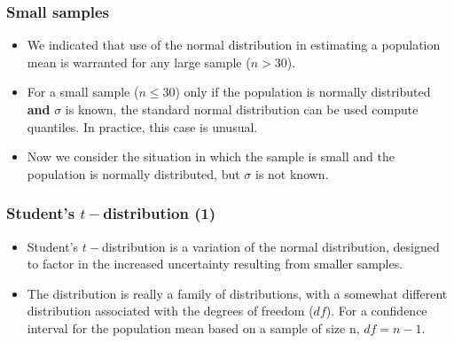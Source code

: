 \documentclass[a4]{beamer}
\begin{document}

\begin{frame}
\frametitle{Small samples}
\begin{itemize} \item We indicated that use of the normal distribution in estimating a population mean is warranted
for any large sample ($n > 30$). \item For a small sample ($n \leq 30$) only if the population is normally distributed
\textbf{and} $\sigma$ is known, the standard normal distribution can be used compute quantiles. In practice,
this case is unusual.
\item Now we consider the situation in which the sample is small and the population is normally distributed,
but $\sigma$ is not known.
\end{itemize}
\end{frame}
\begin{frame}
\frametitle{Student's $t-$distribution (1)}
\begin{itemize}
\item Student's $t-$distribution is a variation of the normal distribution, designed to factor in the increased uncertainty resulting from smaller samples.
\item The distribution is really a family of distributions, with
a somewhat different distribution associated with the degrees of freedom ($df$). For a confidence interval for the
population mean based on a sample of size n, $df = n - 1$.
\end{itemize}
\end{frame}
\end{document}
